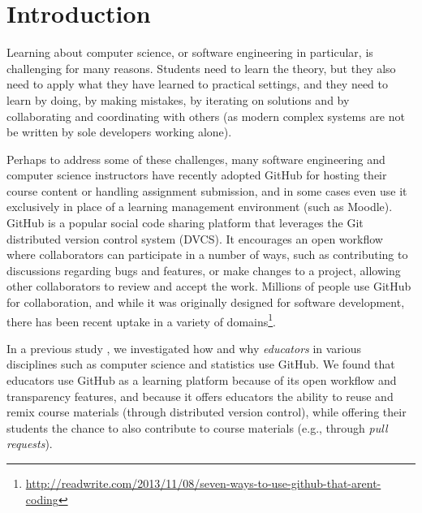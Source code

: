 \section{Introduction}


Learning about computer science, or software engineering in particular, is challenging for many reasons. Students need to learn the theory, but they also need to apply what they have learned to practical settings, and they need to learn by doing, by making mistakes, by iterating on solutions and by collaborating and coordinating with others (as modern complex systems are not be written by sole developers working alone).

Perhaps to address some of these challenges, many software engineering and computer science instructors have recently adopted GitHub for hosting their course content or handling assignment submission, and in some cases even use it exclusively in place of a learning management environment (such as Moodle).
%
GitHub is a popular social code sharing platform that leverages the Git distributed version control system (DVCS). It encourages an open workflow where collaborators can participate in a number of ways, such as contributing to discussions regarding bugs and features, or make changes to a project, allowing other collaborators to review and accept the work. Millions of people use GitHub for collaboration, and while it was originally designed for software development, there has been recent uptake in a variety of domains\footnote{\url{http://readwrite.com/2013/11/08/seven-ways-to-use-github-that-arent-coding}}.

 In a previous study \cite{zagalsky2015emergence}, we investigated how and why \emph{educators} in various disciplines such as computer science and statistics use GitHub. We found that educators use GitHub as a learning platform because of its open workflow and transparency features, and because it offers educators the ability to reuse and remix course materials (through distributed version control), while offering their students the chance to also contribute to course materials (e.g., through \emph{pull requests}).

